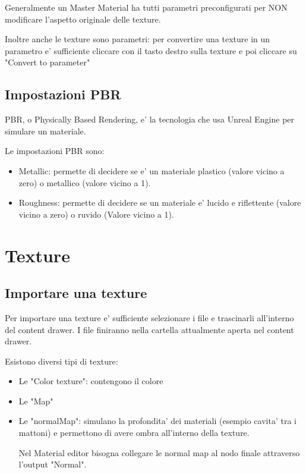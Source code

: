             Generalmente un Master Material ha tutti parametri preconfigurati per NON modificare l'aspetto originale delle texture.

            Inoltre anche le texture sono parametri: per convertire una texture in un parametro e' sufficiente cliccare con il tasto destro sulla texture e poi cliccare su "Convert to parameter"

        \subsection{Impostazioni PBR}
            PBR, o Physically Based Rendering, e' la tecnologia che usa Unreal Engine per simulare un materiale.

            Le impostazioni PBR sono:
            \begin{itemize}
                \item Metallic: permette di decidere se e' un materiale plastico (valore vicino a zero) o metallico (valore vicino a 1).
                \item Roughness: permette di decidere se un materiale e' lucido e riflettente (valore vicino a zero) o ruvido (Valore vicino a 1).
            \end{itemize}


    \section{Texture}

        \subsection{Importare una texture}
            Per importare una texture e' sufficiente selezionare i file e trascinarli all'interno del content drawer. I file finiranno nella cartella attualmente aperta nel content drawer.

            Esistono diversi tipi di texture:
            \begin{itemize}
                \item Le "Color texture": contengono il colore
                \item Le "Map"
                \item Le "normalMap": simulano la profondita' dei materiali (esempio cavita' tra i mattoni) e permettono di avere ombra all'interno della texture.

                    \begin{notebox}
                        Nel Material editor bisogna collegare le normal map al nodo finale attraverso l'output "Normal".
                    \end{notebox}
            \end{itemize}

